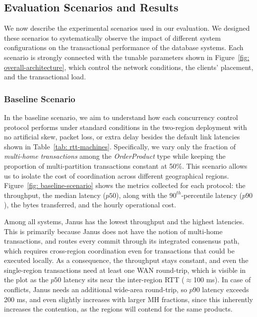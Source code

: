 \subsection{Evaluation Scenarios and Results}
\label{subsec: evaluation-scenarios-and-results}
We now describe the experimental scenarios used in our evaluation. We designed these scenarios to systematically observe the impact of different system configurations on the transactional performance of the database systems. Each scenario is strongly connected with the tunable parameters shown in Figure~\ref{fig: overall-architecture}, which control the network conditions, the clients' placement, and the transactional load.

\subsubsection{Baseline Scenario}
\label{subsubsec: baseline-scenario}
In the baseline scenario, we aim to understand how each concurrency control protocol performs under standard conditions in the two-region deployment with no artificial skew, packet loss, or extra delay besides the default link latencies shown in Table~\ref{tab: rtt-machines}. Specifically, we vary only the fraction of \textit{multi-home transactions} among the \textit{OrderProduct} type while keeping the proportion of multi-partition transactions constant at 50\%. This scenario allows us to isolate the cost of coordination across different geographical regions. Figure~\ref{fig: baseline-scenario} shows the metrics collected for each protocol: the throughput, the median latency ($p50$), along with the $90^{th}$-percentile latency ($p90$), the bytes transferred, and the hourly operational cost.

Among all systems, Janus has the lowest throughput and the highest latencies. This is primarily because Janus does not have the notion of multi-home transactions, and routes every commit through its integrated consensus path, which requires cross-region coordination even for transactions that could be executed locally. As a consequence, the throughput stays constant, and even the single-region transactions need at least one WAN round-trip, which is visible in the plot as the $p50$ latency sits near the inter-region RTT ($\approx$100 ms). In case of conflicts, Janus needs an additional wide-area round-trip, so $p90$ latency exceeds 200 ms, and even slightly increases with larger MH fractions, since this inherently increases the contention, as the regions will contend for the same products.

